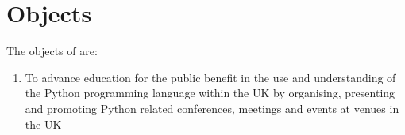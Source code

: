 \section{Objects}\label{sec:objects}
The objects of \shortname{} are:
\begin{enumerate}
    \item To advance education for the public benefit in the use and understanding of the Python programming language within the UK by organising, presenting and promoting Python related conferences, meetings and events at venues in the UK
\end{enumerate}
